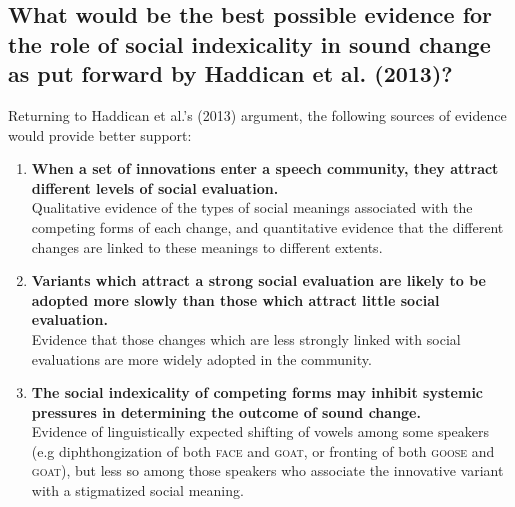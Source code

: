 \documentclass{article}
\begin{document}
\subsection*{What would be the best possible evidence for the role of social indexicality in sound change as put forward by Haddican et al. (2013)?}

Returning to Haddican et al.'s (2013) argument, the following sources of evidence would provide better support:
\begin{enumerate}[i]
\item{\textbf{When a set of innovations enter a speech community, they attract different levels of social evaluation.}
\\Qualitative evidence of the types of social meanings associated with the competing forms of each change, and quantitative evidence that the different changes are linked to these meanings to different extents.}
\item{\textbf{Variants which attract a strong social evaluation are likely to be adopted more slowly than those which attract little social evaluation.} 
\\Evidence that those changes which are less strongly linked with social evaluations are more widely adopted in the community.}
\item{\textbf{The social indexicality of competing forms may inhibit systemic pressures in determining the outcome of sound change.} 
\\Evidence of linguistically expected shifting of vowels among some speakers (e.g diphthongization of both \textsc{face} and \textsc{goat}, or fronting of both \textsc{goose} and \textsc{goat}), but less so among those speakers who associate the innovative variant with a stigmatized social meaning.}
\end{enumerate}

\end{document}
